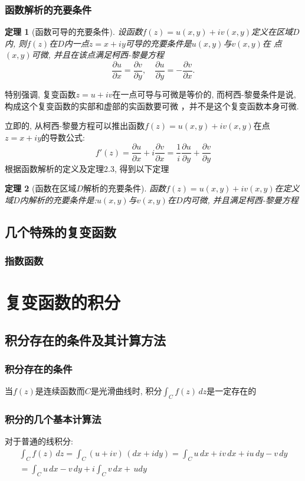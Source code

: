 \documentclass[12pt, a4paper, oneside]{ctexart}
\theoremstyle{plain}
\newtheorem{theorem}{定理}[section]
\theoremstyle{definition}
\theoremstyle{definition}
\begin{document}
\subsubsection{函数解析的充要条件}
\begin{theorem}[函数可导的充要条件]
设函数$f(z)=u(x,y)+iv(x,y)$定义在区域$D$内, 则$f(z)$在$D$内一点$z=x+iy$可导的充要条件是$u(x,y)$与$v(x,y)$在
点$(x,y)$可微, 并且在该点满足柯西-黎曼方程
\[
    \frac{\partial u}{\partial x}=\frac{\partial v}{\partial y}, \quad\frac{\partial u}{\partial y}=
    -\frac{\partial v}{\partial x}.
\]
\end{theorem}
特别强调, 复变函数$z=u+iv$在一点可导与可微是等价的, 而柯西-黎曼条件是说, 构成这个复变函数的实部和虚部的实函数要可微
，并不是这个复变函数本身可微.

立即的, 从柯西-黎曼方程可以推出函数$f(z)=u(x,y)+iv(x,y)$在点$z=x+iy$的导数公式:
\[
    f'(z)=\frac{\partial u}{\partial x}+i\frac{\partial v}{\partial x}=
    \frac{1}{i}\frac{\partial u}{\partial y}+\frac{\partial v}{\partial y}
\]
根据函数解析的定义及定理2.3, 得到以下定理
\begin{theorem}[函数在区域$D$解析的充要条件]
    函数$f(z)=u(x,y)+iv(x,y)$在定义域$D$内解析的充要条件是:$u(x,y)$与$v(x,y)$在$D$内可微, 并且满足柯西-黎曼方程
\end{theorem}
\subsection{几个特殊的复变函数}
\subsubsection{指数函数}
\section{复变函数的积分}
\subsection{积分存在的条件及其计算方法}
\subsubsection{积分存在的条件}
当$f(z)$是连续函数而$C$是光滑曲线时, 积分$\int_{C}f(z)  \,dz $是一定存在的
\subsubsection{积分的几个基本计算法}
对于普通的线积分:
\begin{align*}
    \int_{C}f(z)\,dz=\int_{C}(u+iv)\,(dx+idy)=\int_{C}u\,dx+iv\,dx+iu\,dy-v\,dy \\
    =\int_{C}u\,dx-v\,dy+i\int_{C}v\,dx+\,udy
\end{align*}
\end{document}
